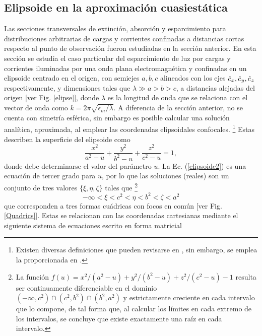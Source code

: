 \hypertarget{elipsoide}{\subsection{Elipsoide en la aproximación cuasiestática}}
Las secciones transversales de extinción, absorción y esparcimiento para distribuciones arbitrarias de cargas y corrientes confinadas a distancias cortas respecto al punto de observación fueron estudiadas en la sección anterior. En esta sección se estudia el caso particular del esparcimiento de luz por cargas y corrientes iluminadas por una onda plana electromagnética y confinadas en un elipsoide centrado en el origen, con semiejes $a,b,c$ alineados con los ejes $\hat{e}_{x},\hat{e}_{y},\hat{e}_{z}$ respectivamente, y dimensiones tales que $\lambda\gg a>b>c$, a distancias alejadas del origen [ver Fig. \ref{elipse}], donde $\lambda$ es la longitud de onda que se relaciona con el vector de onda como $k=2\pi\sqrt{\epsilon_m/\lambda}$. A diferencia de la sección anterior, no se cuenta con simetría esférica, sin embargo es posible calcular una solución analítica, aproximada, al emplear las coordenadas elipsoidales confocales. \footnote{Existen diversas definiciones que pueden revisarse en \cite{ConfocalEllip}, sin embargo, se emplea la proporcionada en \cite{Arfken}. } Estas describen la superficie del elipsoide como \cite{ConfocalEllip}
\begin{equation}
	\frac{x^2}{a^2-u}+\frac{y^2}{b^2-u}+\frac{z^2}{c^2-u}=1,
	\label{elipsoide2}
\end{equation}
 donde debe determinarse el valor del parámetro $u$. La Ec. (\ref{elipsoide2}) es una ecuación de tercer grado para $u$, por lo que las soluciones (reales) son un conjunto de tres valores $\{\xi,\eta,\zeta\}$ tales que \footnote{La función $f(u)=x^2/(a^2-u)+y^2/(b^2-u)+z^2/(c^2-u)-1$ resulta ser continuamente diferenciable en el dominio $(-\infty, c^2)\cap (c^2, b^2)\cap (b^2, a^2)$ y estrictamente creciente en cada intervalo que lo compone, de tal forma que, al calcular los límites en cada extremo de los intervalos, se concluye que existe exactamente una raíz en cada intervalo.}
\begin{equation}
	-\infty<\xi<c^2<\eta<b^2<\zeta<a^2
\end{equation}
que corresponden a tres formas cuádricas con focos en común [ver Fig. \ref{Quadrics}]. Estas se relacionan con las coordenadas cartesianas mediante el siguiente sistema de ecuaciones escrito en forma matricial
%
